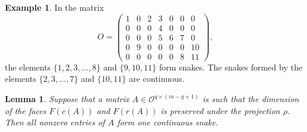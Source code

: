 \documentclass[a4paper,12pt]{amsart}
\newtheorem{lemma}[formula]{Lemma}
\theoremstyle{definition}
\newtheorem{example}[formula]{Example}
\theoremstyle{remark}
\numberwithin{equation}{section}
\begin{document}
\begin{example} In the matrix
$$O = \begin{pmatrix}
1 & 0 & 2 & 3 & 0 & 0 & 0\\
0 & 0 & 0 & 4 & 0 & 0 & 0\\
0 & 0 & 0 & 5 & 6 & 7 & 0\\
0 & 9 & 0 & 0 & 0 & 0 & 10\\
0 & 0 & 0 & 0 & 0 & 8 & 11
\end{pmatrix},$$
the elements $\{1, 2, 3, \ldots, 8 \}$ and $\{9, 10, 11\}$ form snakes. 
The snakes formed by the elements $\{2, 3, \ldots, 7 \}$ and $\{10, 11\}$ are continuous.
\end{example}

\begin{lemma}\label{snake}
Suppose that a matrix $A \in \mathcal{O}^{q \times (m-q+1)}$ 
is such that the dimension of the faces 
$F(c(A))$ and $F(r(A))$ is preserved under the projection $\rho$.
Then all nonzero entries of $A$ form one continuous snake. 

\end{lemma}
\end{document}
